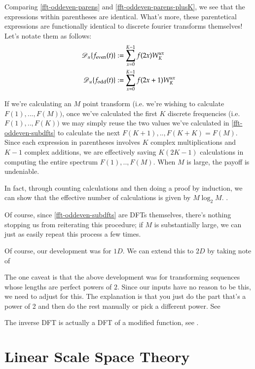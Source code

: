 Comparing \cref{fft-oddeven-parens} and \cref{fft-oddeven-parens-plusK}, we see that the expressions within parentheses are identical.
	What's more, these parentetical expressions are functionally identical to discrete fourier transforms themselves! Let's notate them as follows:
	\begin{align} \label{fft-oddeven-subdfts}
	\operatorname{\mathscr{D}}_u\{f_{\mathrm{even}}(t)\} &:= \sum_{x=0}^{K-1} f(2x)W_K^{ux} \\
	\operatorname{\mathscr{D}}_u\{f_{\mathrm{odd}}(t)\} &:= \sum_{x=0}^{K-1} f(2x+1)W_K^{ux}
	\end{align}
	
	If we're calculating an $M$ point transform  (i.e. we're wishing to
	calculate $F(1), ... , F(M))$, once we've calculated the first $K$ discrete frequencies (i.e. $F(1), .. , F(K))$ we may simply reuse the two values we've calculated in \cref{fft-oddeven-subdfts} to calculate the next $F(K+1),..,F(K+K) = F(M)$. Since each expression in parentheses involves $K$ complex multiplications and $K-1$ complex additions, we are effectively saving $K(2K-1)$ calculations in computing the entire spectrum  $F(1), ..,  F(M)$. When $M$ is large, the payoff is undeniable.

In fact, through counting calculations and then doing a proof by induction, we can show that the effective number of calculations is given by $M\log_2{M}$. .

Of course, since \cref{fft-oddeven-subdfts} are DFTs themselves, there's nothing stopping us from reiterating this procedure; if $M$ is substantially large, we can just as easily repeat this process a few times.

Of course, our development was for $1D$.  We can extend this to $2D$ by taking note of 
	
The one caveat is that the above development was for transforming sequences whose lengths are perfect powers of $2$. Since our inputs have no reason to be this, we need to adjust for this. The explanation is  that you just do the part that's a power of 2 and  then do the rest manually or pick a different power. See 


The inverse DFT is actually a DFT of a modified function, see . 

\hrulefill
\section{Linear Scale Space Theory}
	
